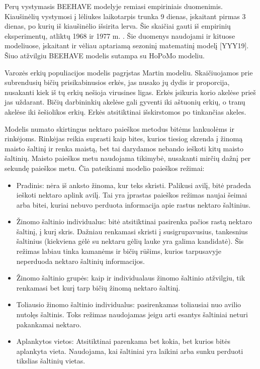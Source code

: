 \documentclass{VUMIFPSmagistrinis}
\begin{document}
Perų vystymasis BEEHAVE modelyje remiasi empiriniais duomenimis. Kiaušinėlių vystymosi į lėliukes laikotarpis trunka 9 dienas, įskaitant pirmas 3 dienas, po kurių iš kiaušinėlio išsirita lerva. Šie skaičiai gauti iš empirinių eksperimentų, atliktų 1968 ir 1977 m. \cite{FuS68, FuO77}. Šie duomenys naudojami ir kituose modeliuose, įskaitant ir vėliau aptariamą sezoninį matematinį modelį [YYY19]. Šiuo atžvilgiu BEEHAVE modelis sutampa su HoPoMo modeliu.


Varozės erkių populiacijos modelis pagrįstas Martin \cite{MAR01} modeliu. Skaičiuojamos prie subrendusių bičių prisikabinusios erkės, jas nusako jų dydis ir proporcija, nusakanti kiek iš tų erkių nešioja virusines ligas. Erkės įsikuria korio akelėse prieš jas uždarant. Bičių darbininkių akelėse gali gyventi iki aštuonių erkių, o tranų akelėse iki šešiolikos erkių. Erkės atsitiktinai išskirstomos po tinkančias akeles. 


Modelis numato skirtingus nektaro paieškos metodus bitėms lankuolėms ir rinkėjoms. Rinkėjas reikia suprasti kaip bites, kurios tiesiog skrenda į žinomą maisto šaltinį ir renka maistą, bet tai darydamos nebando ieškoti kitų maisto šaltinių. Maisto paieškos metu naudojama tikimybė, nusakanti mirčių dažnį per sekundę paieškos metu. Čia pateikiami modelio paieškos režimai:
\begin{itemize}
    \item Pradinis: nėra iš anksto žinoma, kur teks skristi. Palikusi avilį, bitė pradeda ieškoti nektaro aplink avilį. Tai yra įprastas paieškos režimas naujai šeimai arba bitei, kuriai nebuvo perduota informacija apie rastus nektaro šaltinius.
    \item Žinomo šaltinio individualus: bitė atsitiktinai pasirenka pačios rastą nektaro šaltinį, į kurį skris. Dažniau renkamasi skristi į susigrupavusius, tankesnius šaltinius (kiekviena gėlė su nektaru gėlių lauke yra galima kandidatė). Šis režimas labiau tinka kamanėms ir bičių rūšims, kurios tarpusavyje neperduoda nektaro šaltinių informacijos.
    \item Žinomo šaltinio grupės: kaip ir individualaus žinomo šaltinio atžvilgiu, tik renkamasi bet kurį tarp bičių žinomą nektaro šaltinį.
    \item Toliausio žinomo šaltinio individualus: pasirenkamas toliausiai nuo avilio nutolęs šaltinis. Toks režimas naudojamas jeigu arti esantys šaltiniai neturi pakankamai nektaro.
    \item Aplankytos vietos: Atsitiktinai parenkama bet kokia, bet kurios bitės aplankyta vieta. Naudojama, kai šaltiniai  yra laikini arba sunku perduoti tikslias šaltinių vietas.
    
\end{itemize}
\end{document}
